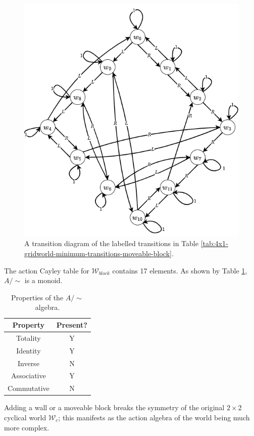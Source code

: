 \begin{figure}[H]
    \centering
    \includegraphics[width=0.7\linewidth]{5BeyondSBDRL/Old/Images/fig-4x1-block-min-actions-wall.png}
    \caption{
    A transition diagram of the labelled transitions in Table \ref{tab:4x1-gridworld-minimum-transitions-moveable-block}.
    }
    \label{fig:4x1-block-min-actions-wall}
\end{figure}

The action Cayley table for $\mathscr{W}_{block}$ contains 17 elements.
As shown by Table \ref{tab:block-world-properties}, $A/\sim$ is a monoid.

\begin{table}[H]
    \centering
    \begin{tabular}{c|c}
        \textbf{Property}   & \textbf{Present?} \\
        \hline
        Totality            & Y\\
        Identity            & Y\\
        Inverse             & N\\
        Associative         & Y\\
        Commutative         & N
    \end{tabular}
    \caption{Properties of the $A/\sim$ algebra.}
    \label{tab:block-world-properties}
\end{table}

\begin{remark}
    Adding a wall or a moveable block breaks the symmetry of the original $2 \times 2$ cyclical world $\mathscr{W}_{c}$; this manifests as the action algebra of the world being much more complex.
\end{remark}

